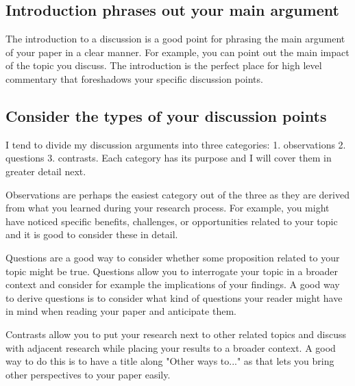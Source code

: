 \subsection{Introduction phrases out your main argument}

The introduction to a discussion is a good point for phrasing the main argument of your paper in a clear manner.
For example, you can point out the main impact of the topic you discuss.
The introduction is the perfect place for high level commentary that foreshadows your specific discussion points.

\subsection{Consider the types of your discussion points}

I tend to divide my discussion arguments into three categories: 1. observations 2. questions 3. contrasts.
Each category has its purpose and I will cover them in greater detail next.

Observations are perhaps the easiest category out of the three as they are derived from what you learned during your research process.
For example, you might have noticed specific benefits, challenges, or opportunities related to your topic and it is good to consider these in detail.

Questions are a good way to consider whether some proposition related to your topic might be true.
Questions allow you to interrogate your topic in a broader context and consider for example the implications of your findings.
A good way to derive questions is to consider what kind of questions your reader might have in mind when reading your paper and anticipate them.

Contrasts allow you to put your research next to other related topics and discuss with adjacent research while placing your results to a broader context.
A good way to do this is to have a title along "Other ways to..." as that lets you bring other perspectives to your paper easily.



